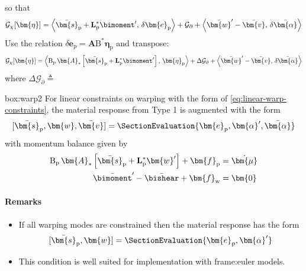 so that
\begin{equation*}
\mathcal{G}_{\chi}[\bm{\eta}] = 
\left< \bar{\bm{s}}_{\mathrm{p}} + \mathbf{L}_{\mathrm{p}}^* \bimoment' ,\, \delta \bm{e}_{\mathrm{p}} \right>
+\mathcal{G}_{\partial}
+\left< \bar{\bm{w}}'-\bar{\bm{v}} ,\, \delta \bar{\bm{\alpha}} \right>
\end{equation*}
Use the relation \(\delta \bm{e}_{\mathrm{p}} = \bm{A}\mathrm{B}^*\bm{\eta}_{\mathrm{p}}\)
and transpose:
\begin{equation}
\mathcal{G}_{\chi}[\bm{\eta}] = 
\left< \operatorname{B}_{\mathrm{p}} \bm{A}_{*} \left[\bar{\bm{s}}_{\mathrm{p}} + \mathbf{L}_{\mathrm{p}}^* \bimoment' \right],\,  \bm{\eta}_{\mathrm{p}} \right>
+\Delta \mathcal{G}_{\partial}
+\left< \bar{\bm{w}}'-\bar{\bm{v}} ,\, \delta \bar{\bm{\alpha}} \right>
\end{equation}
where \(\Delta \mathcal{G}_{\partial} \triangleq\)

\vspace{1ex}
\begin{ambox}{box:warp2}
For linear constraints on warping with the form of \eqref{eq:linear-warp-constraints}, the material response from Type 1 is augmented with the form
\[
[\bar{\bm{s}}_{\mathrm{p}},\bm{w},\bar{\bm{v}}] = \SectionEvaluation{
\bm{e}_{\mathrm{p}}, \bm{\alpha}', \bar{\bm{\alpha}}
}
\]
with momentum balance given by
\begin{equation}
\begin{aligned}
    \operatorname{B}_{\mathrm{p}} \bm{A}_* \left[\bar{\bm{s}}_{\mathrm{p}} + \mathbf{L}_{\mathrm{p}}^*\bm{w}'\right]+ \bm{f}_{\mathrm{p}} &= \dot{\bm{\mu}} \\ 
    \bar{\bimoment}' - \bar{\bishear} + \bm{f}_{\mathrm{w}} &= \bm{0}
\end{aligned}
\label{eq:type2-equilibrium}
\end{equation}
\end{ambox}

\paragraph{Remarks}
\begin{itemize}
    \item If all warping modes are constrained then the material response has the form
\[
[\bar{\bm{s}}_{\mathrm{p}},\bm{w}] = \SectionEvaluation{\bm{e}_{\mathrm{p}}, \bm{\alpha}'}
\]

\item This condition is well suited for implementation with \gls{frame:euler} models.
\end{itemize}

